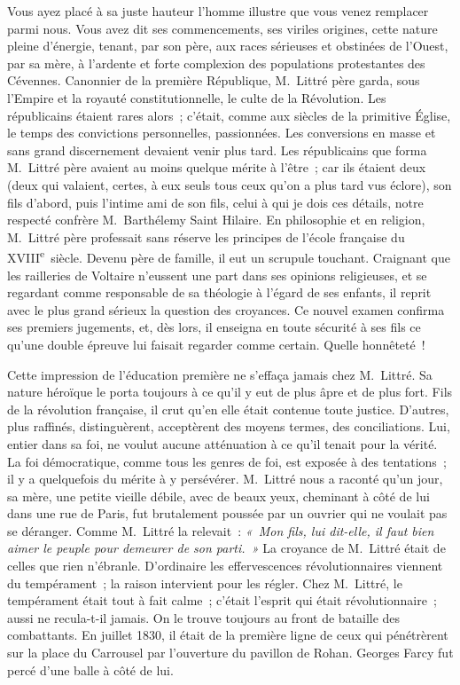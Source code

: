 \documentclass[french,twoside]{book} %
\newcommand\orgName[1]{#1}
\newcommand\persName[1]{#1}
\newcommand\placeName[1]{#1}
\begin{document}
Vous ayez placé à sa juste hauteur l’homme illustre que vous venez remplacer parmi nous. Vous avez dit ses commencements, ses viriles origines, cette nature pleine d’énergie, tenant, par son père, aux races sérieuses et obstinées de l’{\placeName Ouest}, par sa mère, à l’ardente et forte complexion des populations protestantes des {\placeName Cévennes}. Canonnier de la première République, {\persName M. Littré} père garda, sous l’Empire et la royauté constitutionnelle, le culte de la Révolution. Les républicains étaient rares alors ; c’était, comme aux siècles de la primitive {\orgName Église}, le temps des convictions personnelles, passionnées. Les conversions en masse et sans grand discernement devaient venir plus tard. Les républicains que forma {\persName M. Littré} père avaient au moins quelque mérite à l’être ; car ils étaient deux (deux qui valaient, certes, à eux seuls tous ceux qu’on a plus tard vus éclore), son fils d’abord, puis l’intime ami de son fils, celui à qui je dois ces détails, notre respecté confrère {\persName M. Barthélemy Saint Hilaire}. En philosophie et en religion, {\persName M. Littré} père professait sans réserve les principes de l’{\orgName école française} du XVIII\textsuperscript{e} siècle. Devenu père de famille, il eut un scrupule touchant. Craignant que les railleries de {\persName Voltaire} n’eussent une part dans ses opinions religieuses, et se regardant comme responsable de sa théologie à l’égard de ses enfants, il reprit avec le plus grand sérieux la question des croyances. Ce nouvel examen confirma ses premiers jugements, et, dès lors, il enseigna en toute sécurité à ses fils ce qu’une double épreuve lui faisait regarder comme certain. Quelle honnêteté !\par
Cette impression de l’éducation première ne s’effaça jamais chez {\persName M. Littré}. Sa nature héroïque le porta toujours à ce qu’il y eut de plus âpre et de plus fort. Fils de la révolution française, il crut qu’en elle était contenue toute justice. D’autres, plus raffinés, distinguèrent, acceptèrent des moyens termes, des conciliations. Lui, entier dans sa foi, ne voulut aucune atténuation à ce qu’il tenait pour la vérité. La foi démocratique, comme tous les genres de foi, est exposée à des tentations ; il y a quelquefois du mérite à y persévérer. {\persName M. Littré} nous a raconté qu’un jour, sa mère, une petite vieille débile, avec de beaux yeux, cheminant à côté de lui dans une rue de {\placeName Paris}, fut brutalement poussée par un ouvrier qui ne voulait pas se déranger. Comme {\persName M. Littré} la relevait : \emph{« Mon fils, lui dit-elle, il faut bien aimer le peuple pour demeurer de son parti. »} La croyance de {\persName M. Littré} était de celles que rien n’ébranle. D’ordinaire les effervescences révolutionnaires viennent du tempérament ; la raison intervient pour les régler. Chez {\persName M. Littré}, le tempérament était tout à fait calme ; c’était l’esprit qui était révolutionnaire ; aussi ne recula-t-il jamais. On le trouve toujours au front de bataille des combattants. En juillet 1830, il était de la première ligne de ceux qui pénétrèrent sur la {\placeName place du Carrousel} par l’ouverture du {\placeName pavillon de Rohan}. {\persName Georges Farcy} fut percé d’une balle à côté de lui.\par
\end{document}
